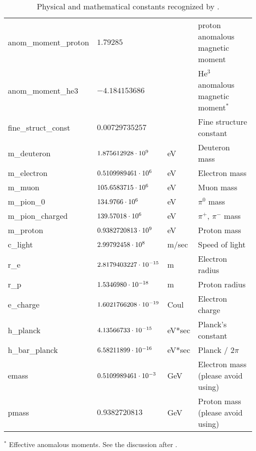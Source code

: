 {{{\begin{table}[h]
\begin{tabular}{llll}
  anom_moment_proton    & $1.79285$                &             & proton anomalous magnetic moment       \\
  anom_moment_he3       & $-4.184153686$           &             & He$^3$ anomalous magnetic moment$^*$   \\ 
  fine_struct_const     & $0.00729735257$          &             & Fine structure constant                \\
  m_deuteron            & $1.875612928 \cdot 10^{9}$    & eV          & Deuteron mass         \\
  m_electron            & $0.5109989461 \cdot 10^{6}$   & eV          & Electron mass         \\
  m_muon                & $105.6583715 \cdot 10^{6}$    & eV          & Muon mass             \\
  m_pion_0              & $134.9766 \cdot 10^{6}$       & eV          & $\pi^0$ mass          \\
  m_pion_charged        & $139.57018 \cdot 10^{6}$      & eV          & $\pi^+$, $\pi^-$ mass \\
  m_proton              & $0.9382720813 \cdot 10^{9}$   & eV          & Proton mass           \\
  c_light               & $2.99792458 \cdot 10^{8}$     & m/sec       & Speed of light        \\
  r_e                   & $2.8179403227 \cdot 10^{-15}$ & m           & Electron radius       \\
  r_p                   & $1.5346980 \cdot 10^{-18}$    & m           & Proton radius         \\
  e_charge              & $1.6021766208 \cdot 10^{-19}$ & Coul        & Electron charge       \\
  h_planck              & $4.13566733 \cdot 10^{-15}$   & eV*sec      & Planck's constant     \\
  h_bar_planck          & $6.58211899 \cdot 10^{-16}$   & eV*sec      & Planck / $2\pi$       \\
  emass                 & $0.5109989461 \cdot 10^{-3}$  & GeV         & Electron mass (please avoid using)   \\
  pmass                 & $0.9382720813$           & GeV         & Proton mass (please avoid using)     \\ \bottomrule
\end{tabular}
$^*$ Effective anomalous moments. See the discussion after .
\caption{Physical and mathematical constants recognized by \bmad.}
\label{t:constants}
\end{table}

}}}
